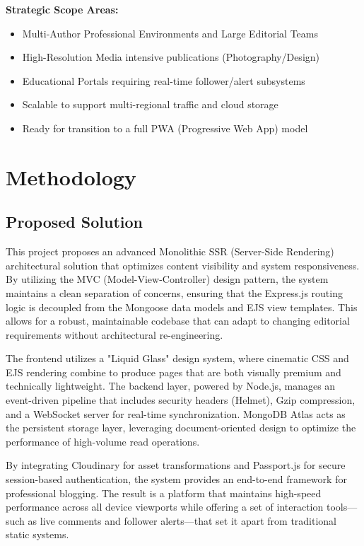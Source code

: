 \documentclass[12pt,a4paper]{report}
\begin{document}
\textbf{Strategic Scope Areas:}
\begin{itemize}
    \item Multi-Author Professional Environments and Large Editorial Teams
    \item High-Resolution Media intensive publications (Photography/Design)
    \item Educational Portals requiring real-time follower/alert subsystems
    \item Scalable to support multi-regional traffic and cloud storage
    \item Ready for transition to a full PWA (Progressive Web App) model
\end{itemize}

\newpage

\chapter{Methodology}

\section{Proposed Solution}
\indent This project proposes an advanced Monolithic SSR (Server-Side Rendering) architectural solution that optimizes content visibility and system responsiveness. By utilizing the MVC (Model-View-Controller) design pattern, the system maintains a clean separation of concerns, ensuring that the Express.js routing logic is decoupled from the Mongoose data models and EJS view templates. This allows for a robust, maintainable codebase that can adapt to changing editorial requirements without architectural re-engineering.

The frontend utilizes a "Liquid Glass" design system, where cinematic CSS and EJS rendering combine to produce pages that are both visually premium and technically lightweight. The backend layer, powered by Node.js, manages an event-driven pipeline that includes security headers (Helmet), Gzip compression, and a WebSocket server for real-time synchronization. MongoDB Atlas acts as the persistent storage layer, leveraging document-oriented design to optimize the performance of high-volume read operations.

By integrating Cloudinary for asset transformations and Passport.js for secure session-based authentication, the system provides an end-to-end framework for professional blogging. The result is a platform that maintains high-speed performance across all device viewports while offering a set of interaction tools—such as live comments and follower alerts—that set it apart from traditional static systems.
\end{document}
